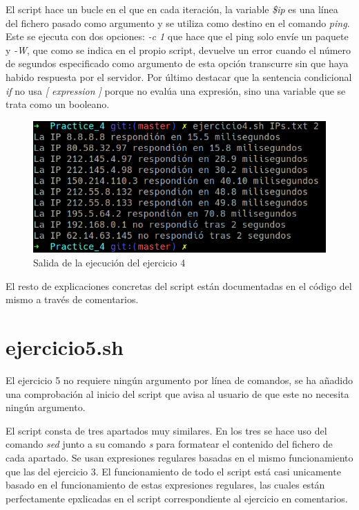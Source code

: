 \documentclass[12pt,a4paper]{article}
\begin{document}
El script hace un bucle en el que en cada iteración, la variable \emph{\$ip} es una línea del fichero pasado como argumento y se utiliza como destino en el comando \emph{ping}. Este se ejecuta con dos opciones: \emph{-c 1} que hace que el ping solo envíe un paquete y \emph{-W}, que como se indica en el propio script, devuelve un error cuando el número de segundos especificado como argumento de esta opción transcurre sin que haya habido respuesta por el servidor. Por último destacar que la sentencia condicional \emph{if} no usa \emph{[ expression ]} porque no evalúa una expresión, sino una variable que se trata como un booleano.

\begin{figure}[ht]
	\centering
	\includegraphics{images/ejercicio4.png}
	\caption{Salida de la ejecución del ejercicio 4}
\end{figure}

El resto de explicaciones concretas del script están documentadas en el código del mismo a través de comentarios.

\newpage

\section{ejercicio5.sh}
El ejercicio 5 no requiere ningún argumento por línea de comandos, se ha añadido una comprobación al inicio del script que avisa al usuario de que este no necesita ningún argumento.

El script consta de tres apartados muy similares. En los tres se hace uso del comando \emph{sed} junto a su comando \emph{s} para formatear el contenido del fichero de cada apartado. Se usan expresiones regulares basadas en el mismo funcionamiento que las del ejercicio 3. El funcionamiento de todo el script está casi unicamente basado en el funcionamiento de estas expresiones regulares, las cuales están perfectamente epxlicadas en el script correspondiente al ejercicio en comentarios.
\end{document}
